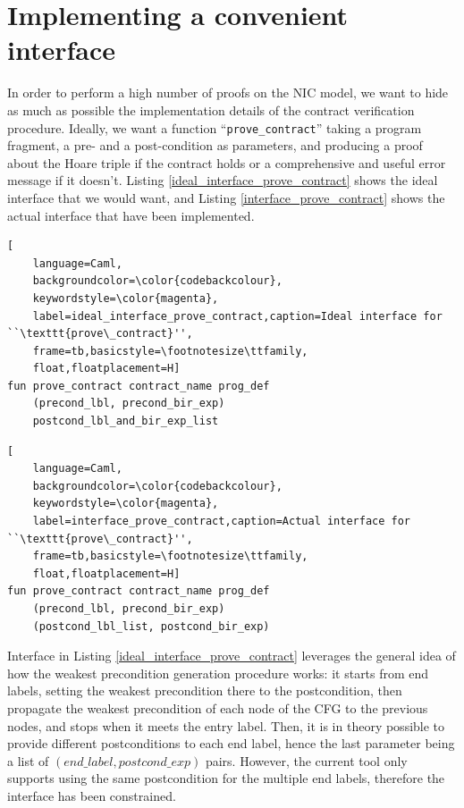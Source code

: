 \documentclass{kththesis}
\begin{document}
{%

\section{Implementing a convenient interface} \label{impl_convenient_ht_interface}

In order to perform a high number of proofs on the \gls{NIC} model, we want to hide as much as possible the implementation details of the contract verification procedure. Ideally, we want a function ``\texttt{prove\_contract}'' taking a program fragment, a pre- and a post-condition as parameters, and producing a proof about the Hoare triple if the contract holds or a comprehensive and useful error message if it doesn't. Listing \ref{ideal_interface_prove_contract} shows the ideal interface that we would want, and Listing \ref{interface_prove_contract} shows the actual interface that have been implemented.

\begin{lstlisting}[
    language=Caml,
    backgroundcolor=\color{codebackcolour},
    keywordstyle=\color{magenta},
    label=ideal_interface_prove_contract,caption=Ideal interface for ``\texttt{prove\_contract}'',
    frame=tb,basicstyle=\footnotesize\ttfamily,
    float,floatplacement=H]
fun prove_contract contract_name prog_def
    (precond_lbl, precond_bir_exp)
    postcond_lbl_and_bir_exp_list
\end{lstlisting}

\begin{lstlisting}[
    language=Caml,
    backgroundcolor=\color{codebackcolour},
    keywordstyle=\color{magenta},
    label=interface_prove_contract,caption=Actual interface for ``\texttt{prove\_contract}'',
    frame=tb,basicstyle=\footnotesize\ttfamily,
    float,floatplacement=H]
fun prove_contract contract_name prog_def
    (precond_lbl, precond_bir_exp)
    (postcond_lbl_list, postcond_bir_exp)
\end{lstlisting}

Interface in Listing \ref{ideal_interface_prove_contract} leverages the general idea of how the weakest precondition generation procedure works: it starts from end labels, setting the weakest precondition there to the postcondition, then propagate the weakest precondition of each node of the \gls{CFG} to the previous nodes, and stops when it meets the entry label. Then, it is in theory possible to provide different postconditions to each end label, hence the last parameter being a list of $(end\_label, postcond\_exp)$ pairs. However, the current tool only supports using the same postcondition for the multiple end labels, therefore the interface has been constrained\footnotemark.

}
\end{document}
